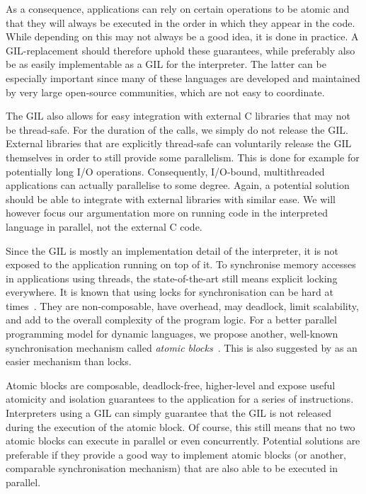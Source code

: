 \documentclass{sigplanconf}
\begin{document}
As a consequence, applications can rely on certain operations to be
atomic and that they will always be executed in the order in which
they appear in the code. While depending on this may not always be a
good idea, it is done in practice. A GIL-replacement should therefore
uphold these guarantees, while preferably also be as easily
implementable as a GIL for the interpreter. The latter can be
especially important since many of these languages are developed and
maintained by very large open-source communities, which are not easy
to coordinate.

The GIL also allows for easy integration with external C libraries that
may not be thread-safe. For the duration of the calls, we
simply do not release the GIL. External libraries that are explicitly
thread-safe can voluntarily release the GIL themselves in order to
still provide some parallelism. This is done for example for
potentially long I/O operations. Consequently, I/O-bound,
multithreaded applications can actually parallelise to some
degree. Again, a potential solution should be able to integrate with
external libraries with similar ease. We will however focus our
argumentation more on running code in the interpreted language in
parallel, not the external C code.

Since the GIL is mostly an implementation detail of the interpreter,
it is not exposed to the application running on top of it. To
synchronise memory accesses in applications using threads, the
state-of-the-art still means explicit locking everywhere. It is
known that using locks for synchronisation can be hard at
times~\cite{christopher10,victor11,shan08}. They are non-composable,
have overhead, may deadlock, limit scalability, and add to the overall
complexity of the program logic. For a better parallel programming
model for dynamic languages, we propose another, well-known
synchronisation mechanism called \emph{atomic
  blocks}~\cite{tim03,tim05}. This is also suggested by
\cite{christopher10,victor11} as an easier mechanism than locks.

Atomic blocks are composable, deadlock-free, higher-level and expose
useful atomicity and isolation guarantees to the application for a
series of instructions. Interpreters using a GIL can simply guarantee
that the GIL is not released during the execution of the atomic
block. Of course, this still means that no two atomic blocks can
execute in parallel or even concurrently.  Potential solutions are
preferable if they provide a good way to implement atomic blocks
(or another, comparable synchronisation mechanism) that
are also able to be executed in parallel.
\end{document}
